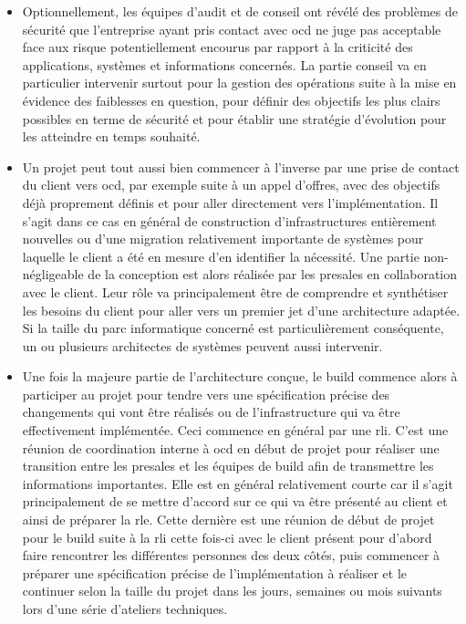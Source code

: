 \documentclass[12pt, oneside, a4paper, titlepage]{report}
\begin{document}
\begin{itemize}

    \item Optionnellement, les équipes d'audit et de conseil ont révélé des
        problèmes de sécurité que l'entreprise ayant pris contact avec \gls{ocd}
        ne juge pas acceptable face aux risque potentiellement encourus par
        rapport à la criticité des applications, systèmes et informations
        concernés. La partie conseil va en particulier intervenir surtout pour
        la gestion des opérations suite à la mise en évidence des faiblesses en
        question, pour définir des objectifs les plus clairs possibles en terme
        de sécurité et pour établir une stratégie d'évolution pour les atteindre
        en temps souhaité.

    \item Un projet peut tout aussi bien commencer à l'inverse par une prise de
        contact du client vers \gls{ocd}, par exemple suite à un appel d'offres,
        avec des objectifs déjà proprement définis et pour aller directement
        vers l'implémentation. Il s'agit dans ce cas en général de construction
        d'infrastructures entièrement nouvelles ou d'une migration relativement
        importante de systèmes pour laquelle le client a été en mesure d'en
        identifier la nécessité. Une partie non-négligeable de la conception est
        alors réalisée par les \gls{presales} en collaboration avec le client.
        Leur rôle va principalement être de comprendre et synthétiser les
        besoins du client pour aller vers un premier jet d'une architecture
        adaptée. Si la taille du parc informatique concerné est particulièrement
        conséquente, un ou plusieurs architectes de systèmes peuvent aussi
        intervenir.

    \item Une fois la majeure partie de l'architecture conçue, le \gls{build}
        commence alors à participer au projet pour tendre vers une spécification
        précise des changements qui vont être réalisés ou de l'infrastructure
        qui va être effectivement implémentée. Ceci commence en général par une
        \gls{rli}. C'est une réunion de coordination interne à \gls{ocd} en
        début de projet pour réaliser une transition entre les \gls{presales} et
        les équipes de \gls{build} afin de transmettre les informations
        importantes. Elle est en général relativement courte car il s'agit
        principalement de se mettre d'accord sur ce qui va être présenté au
        client et ainsi de préparer la \gls{rle}. Cette dernière est une réunion
        de début de projet pour le \gls{build} suite à la \gls{rli} cette
        fois-ci avec le client présent pour d'abord faire rencontrer les
        différentes personnes des deux côtés, puis commencer à préparer une
        spécification précise de l'implémentation à réaliser et le continuer
        selon la taille du projet dans les jours, semaines ou mois suivants lors
        d'une série d'ateliers techniques.


\end{itemize}
\end{document}
